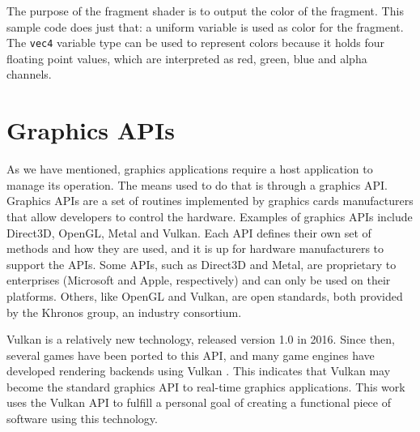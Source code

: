 The purpose of the fragment shader is to output the color of the fragment. This sample code does just that: a uniform variable is used as color for the fragment. The \texttt{vec4} variable type can be used to represent colors because it holds four floating point values, which are interpreted as red, green, blue and alpha channels.

\section{Graphics APIs}
As we have mentioned, graphics applications require a host application to manage its operation. The means used to do that is through a graphics API. Graphics APIs are a set of routines implemented by graphics cards manufacturers that allow developers to control the hardware. Examples of graphics APIs include Direct3D, OpenGL, Metal and Vulkan. Each API defines their own set of methods and how they are used, and it is up for hardware manufacturers to support the APIs. Some APIs, such as Direct3D and Metal, are proprietary to enterprises (Microsoft and Apple, respectively) and can only be used on their platforms. Others, like OpenGL and Vulkan, are open standards, both provided by the Khronos group, an industry consortium.

Vulkan is a relatively new technology, released version 1.0 in 2016. Since then, several games have been ported to this API, and many game engines have developed rendering backends using Vulkan \cite{vulkan}. This indicates that Vulkan may become the standard graphics API to real-time graphics applications. This work uses the Vulkan API to fulfill a personal goal of creating a functional piece of software using this technology.



%
%
